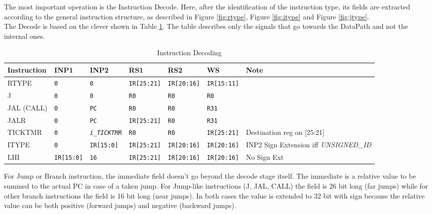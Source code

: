 The most important operation is the Instruction Decode. Here, after the identification of the instruction type, its fields are extracted according to the general instruction structure, as described in Figure \ref{fig:rtype}, Figure \ref{fig:itype} and Figure \ref{fig:jtype}.\\

The Decode is based on the clever shown in Table \ref{table:decode_instr}. The table describes only the signals that go towards the DataPath and not the internal ones.

\begin{table}[H]
    \centering
    \begin{tabularx}{\textwidth}{|l|l|l|l|l|l|X|}
        \hline
        \textbf{Instruction} & INP1 & INP2 & RS1 & RS2 & WS & Note\\
        \hline
        RTYPE & \texttt{0} & \texttt{0} & \texttt{IR[25:21]} & \texttt{IR[20:16]} & \texttt{IR[15:11]} & \\
        \hline
        J & \texttt{0} & \texttt{0} & \texttt{R0} & \texttt{R0} & \texttt{R0} & \\
        \hline
        JAL (CALL) & \texttt{0} & \texttt{PC} & \texttt{R0} & \texttt{R0} & \texttt{R31} & \\
        \hline
        JALR & \texttt{0} & \texttt{PC} & \texttt{IR[25:21]} & \texttt{R0} & \texttt{R31} & \\
        \hline
        TICKTMR & \texttt{0} & \texttt{\emph{i\_TICKTMR}} & \texttt{R0} & \texttt{R0} & \texttt{IR[25:21]} & Destination reg on [25:21]\\
        \hline
        ITYPE & \texttt{0} & \texttt{IR[15:0]} & \texttt{IR[25:21]} & \texttt{IR[20:16]} & \texttt{IR[20:16]} & INP2 Sign Extension iff \emph{UNSIGNED\_ID}\\
        \hline
        LHI & \texttt{IR[15:0]} & \texttt{16} & \texttt{IR[25:21]} & \texttt{IR[20:16]} & \texttt{IR[20:16]} & No Sign Ext\\
        \hline
    \end{tabularx}
    \caption{Instruction Decoding}
    \label{table:decode_instr}
\end{table}

For Jump or Branch instruction, the immediate field doesn't go beyond the decode stage itself. The immediate is a relative value to be summed to the actual PC in case of a taken jump. For Jump-like instructions (J, JAL, CALL) the field is 26 bit long (far jumps) while for other branch instructions the field is 16 bit long (near jumps). In both cases the value is extended to 32 bit with sign because the relative value can be both positive (forward jumps) and negative (backward jumps).

